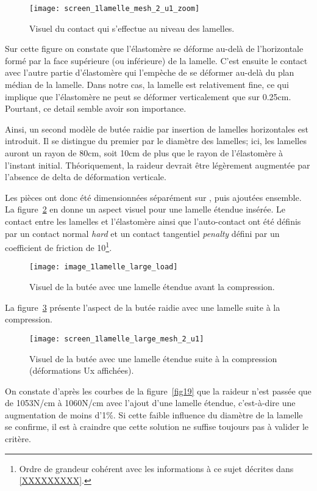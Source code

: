 ﻿\documentclass{article}
\newcommand{\abaqus}{\bsc{Abaqus}\xspace}
\newcommand{\cimg}{0.8}
\begin{document}
\begin{figure}[!h]
	\centering
	\texttt{[image: screen\_1lamelle\_mesh\_2\_u1\_zoom]}
	\caption{Visuel du contact qui s'effectue au niveau des lamelles.}
	\label{fig16}
\end{figure}

Sur cette figure on constate que l'élastomère se déforme au-delà de l'horizontale formé par la face supérieure (ou inférieure) de la lamelle. C'est ensuite le contact avec l'autre partie d'élastomère qui l'empèche de se déformer au-delà du plan médian de la lamelle. Dans notre cas, la lamelle est relativement fine, ce qui implique que l'élastomère ne peut se déformer verticalement que sur 0.25cm. Pourtant, ce detail semble avoir son importance.

Ainsi, un second modèle de butée raidie par insertion de lamelles horizontales est introduit. Il se distingue du premier par le diamètre des lamelles; ici, les lamelles auront un rayon de 80cm, soit 10cm de plus que le rayon de l'élastomère à l'instant initial. Théoriquement, la raideur devrait être légèrement augmentée par l'absence de delta de déformation verticale.

Les pièces ont donc été dimensionnées séparément sur \abaqus, puis ajoutées ensemble. La figure~\ref{fig17} en donne un aspect visuel pour une lamelle étendue insérée. Le contact entre les lamelles et l'élastomère ainsi que l'auto-contact ont été définis par un contact normal \textit{hard} et un contact tangentiel \textit{penalty} défini par un coefficient de friction de 10\footnote{Ordre de grandeur cohérent avec les informations à ce sujet décrites dans \ref{XXXXXXXXX}.}.

\begin{figure}[!h]
	\centering
	\texttt{[image: image\_1lamelle\_large\_load]}
	\caption{Visuel de la butée avec une lamelle étendue avant la compression.}
	\label{fig17}
\end{figure}

La figure~\ref{fig18} présente l'aspect de la butée raidie avec une lamelle suite à la compression.

\begin{figure}[!h]
	\centering
	\texttt{[image: screen\_1lamelle\_large\_mesh\_2\_u1]}
	\caption{Visuel de la butée avec une lamelle étendue suite à la compression (déformations Ux affichées).}
	\label{fig18}
\end{figure}

On constate d'après les courbes de la figure~\ref{fig19} que la raideur n'est passée que de 1053N/cm à 1060N/cm avec l'ajout d'une lamelle étendue, c'est-à-dire une augmentation de moins d'1\%. Si cette faible influence du diamètre de la lamelle se confirme, il est à craindre que cette solution ne suffise toujours pas à valider le critère.
\end{document}
